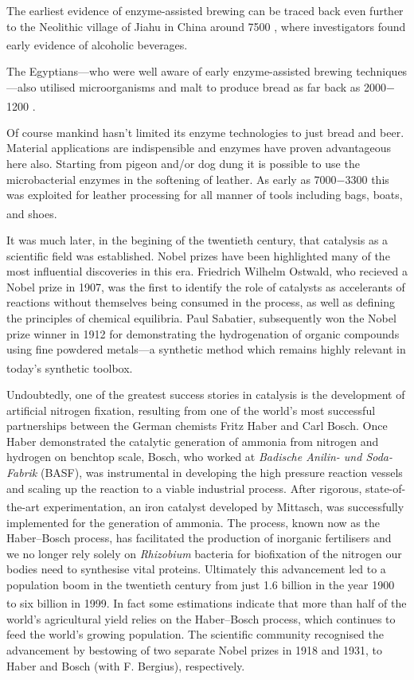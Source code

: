 The earliest evidence of enzyme-assisted brewing can be traced back even further to the Neolithic village of Jiahu in China around 7500 , where investigators found early evidence of alcoholic beverages.\textsuperscript{\cite{mcgovern:2004}}

The Egyptians---who were well aware of early enzyme-assisted brewing techniques---also utilised microorganisms and malt to produce bread as far back as 2000$-$1200 .\textsuperscript{\cite{samuel:1996}}

Of course mankind hasn't limited its enzyme technologies to just bread and beer. Material applications are indispensible and enzymes have proven advantageous here also. Starting from pigeon and/or dog dung it is possible to use the microbacterial enzymes in the softening of leather. As early as 7000$-$3300  this was exploited for leather processing for all manner of tools including bags, boats, and shoes.\textsuperscript{\cite{possehl:1996}}

It was much later, in the begining of the twentieth century, that catalysis as a scientific field was established. Nobel prizes have been highlighted many of the most influential discoveries in this era. Friedrich Wilhelm Ostwald, who recieved a Nobel prize in 1907, was the first to identify the role of catalysts as accelerants of reactions without themselves being consumed in the process, as well as defining the principles of chemical equilibria. Paul Sabatier, subsequently won the Nobel prize winner in 1912 for demonstrating the hydrogenation of organic compounds using fine powdered metals---a synthetic method which remains highly relevant in today's synthetic toolbox.\textsuperscript{\cite{beller:2012}}

Undoubtedly, one of the greatest success stories in catalysis is the development of artificial nitrogen fixation, resulting from one of the world's most successful partnerships between the German chemists Fritz Haber and Carl Bosch. Once Haber demonstrated the catalytic generation of ammonia from nitrogen and hydrogen on benchtop scale, Bosch, who worked at \textit{Badische Anilin- und Soda-Fabrik} (BASF), was instrumental in developing the high pressure reaction vessels and scaling up the reaction to a viable industrial process. After rigorous, state-of-the-art experimentation, an iron catalyst developed by Mittasch,\textsuperscript{\cite{honkala:2005}} was successfully implemented for the generation of ammonia. The process, known now as the Haber--Bosch process, has facilitated the production of inorganic fertilisers and we no longer rely solely on \textit{Rhizobium} bacteria for biofixation of the nitrogen our bodies need to synthesise vital proteins. Ultimately this advancement led to a population boom in the twentieth century from just 1.6 billion in the year 1900 to six billion in 1999.\textsuperscript{\cite{smil:1999}} In fact some estimations indicate that more than half of the world's agricultural yield relies on the Haber--Bosch process, which continues to feed the world's growing population. The scientific community recognised the advancement by bestowing of two separate Nobel prizes in 1918 and 1931, to Haber and Bosch (with F. Bergius), respectively. 

